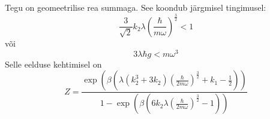 \documentclass{trkut}%
\begin{document}
Tegu on geomeetrilise rea summaga. See koondub järgmisel tingimusel:
\begin{equation}
    \frac{3}{\sqrt{2}}k_2\lambda \left(\frac{\hbar}{m\omega}\right)^{\frac{3}{2}}<1
\end{equation}
või
\begin{equation}
    3 \lambda \hbar g < m \omega^3
\end{equation}
Selle eelduse kehtimisel on
\begin{equation}
    Z=\frac{\exp\left( \beta \left(  \lambda (k_2^3+3k_2)\left(\frac{\hbar}{2m\omega}\right)^{\frac{3}{2}} +k_1 -\frac{1}{2}\right)\right)}{1-\exp \left( \beta\left( 6 k_2 \lambda \left( \frac{\hbar}{2m\omega}\right)^{\frac{3}{2}} - 1 \right)\right)}
\end{equation}

\end{document}
